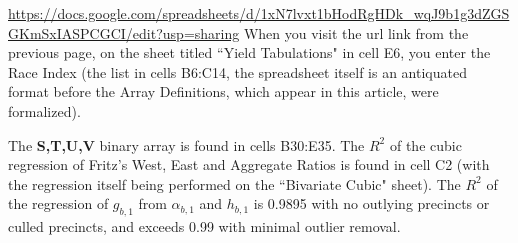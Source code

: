 \documentclass[preprint,13pt]{elsarticle}
\begin{document}
\url{https://docs.google.com/spreadsheets/d/1xN7lvxt1bHodRgHDk_wqJ9b1g3dZGSGKmSxIASPCGCI/edit?usp=sharing}
\newpage
When you visit the url link from the previous page, on the sheet titled ``Yield Tabulations" in cell E6, you enter the Race Index (the list in cells B6:C14, the spreadsheet itself is an antiquated format before the Array Definitions, which appear in this article, were formalized). 

The \textbf{S,T,U,V} binary array is found in cells B30:E35. The $R^2$ of the cubic regression of Fritz's West, East and Aggregate Ratios is found in cell C2 (with the regression itself being performed on the ``Bivariate Cubic" sheet). The $R^2$ of the regression of $g_{b,1}$ from $\alpha_{b,1}$ and $h_{b,1}$ is 0.9895 with no outlying precincts or culled precincts, and exceeds 0.99 with minimal outlier removal.
\end{document}
